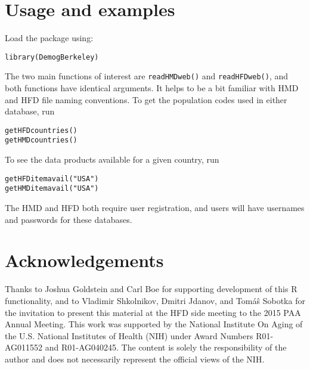 \documentclass{article}
\begin{document}
\section{Usage and examples}
Load the package using:
\begin{verbatim}
library(DemogBerkeley)
\end{verbatim}
The two main functions of interest are \texttt{readHMDweb()} and
\texttt{readHFDweb()}, and both functions have identical arguments. It helps to
be a bit familiar with HMD and HFD file naming conventions. To get the
population codes used in either database, run 
\begin{verbatim}
getHFDcountries()
getHMDcountries()
\end{verbatim}
To see the data products available for a given country, run
\begin{verbatim}
getHFDitemavail("USA")
getHMDitemavail("USA")
\end{verbatim}
The HMD and HFD both require user registration, and users will have usernames
and passwords for these databases.

\section{Acknowledgements}
Thanks to Joshua Goldstein and Carl Boe for supporting development of this R
functionality, and to Vladimir Shkolnikov, Dmitri Jdanov, and Tom\'{a}\^{s}
Sobotka for the invitation to present this material at the HFD side meeting to
the 2015 PAA Annual Meeting.
This work was supported by the National Institute On Aging of the U.S. National Institutes of Health (NIH) under Award Numbers R01-AG011552 and R01-AG040245. The content is solely the responsibility of the
author and does not necessarily represent the official views of the NIH.


   
\end{document}
